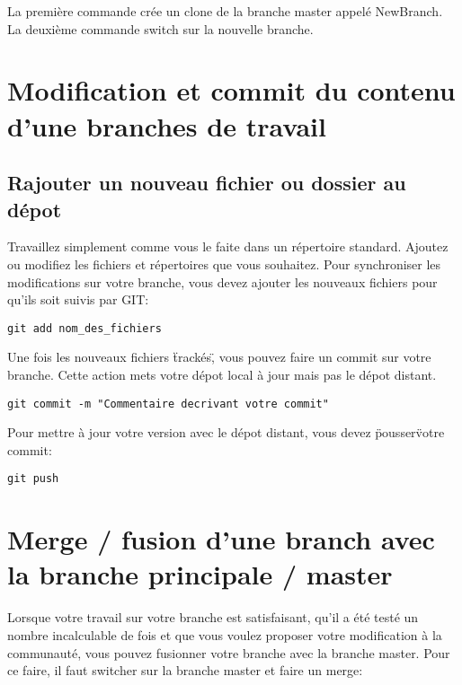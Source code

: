 \documentclass[a4paper,11pt]{article}
\begin{document}
	La première commande crée un clone de la branche master appelé NewBranch. La deuxième commande switch sur la nouvelle branche.

\section{Modification et commit du contenu d'une branches de travail}

	\subsection{Rajouter un nouveau fichier ou dossier au dépot}

	Travaillez simplement comme vous le faite dans un répertoire standard. Ajoutez ou modifiez les fichiers et répertoires que vous souhaitez. Pour synchroniser les modifications sur votre branche, vous devez ajouter les nouveaux fichiers pour qu'ils soit suivis par GIT:
	\bigskip

	\begin{lstlisting}[style=BashInputStyle]
	git add nom_des_fichiers
	\end{lstlisting}
	\bigskip

	Une fois les nouveaux fichiers \"trackés\", vous pouvez faire un commit sur votre branche. Cette action mets votre dépot local à jour mais pas le dépot distant.
	\bigskip

	\begin{lstlisting}[style=BashInputStyle]
	git commit -m "Commentaire decrivant votre commit"
	\end{lstlisting}
	\bigskip

	Pour mettre à jour votre version avec le dépot distant, vous devez \"pousser\" votre commit:
	\bigskip

	\begin{lstlisting}[style=BashInputStyle]
	git push
	\end{lstlisting}
	\bigskip

\section{Merge / fusion d'une branch avec la branche principale / master}

	Lorsque votre travail sur votre branche est satisfaisant, qu'il a été testé un nombre incalculable de fois et que vous voulez proposer votre modification à la communauté, vous pouvez fusionner votre branche avec la branche master. Pour ce faire, il faut switcher sur la branche master et faire un merge:
	\bigskip
\end{document}
